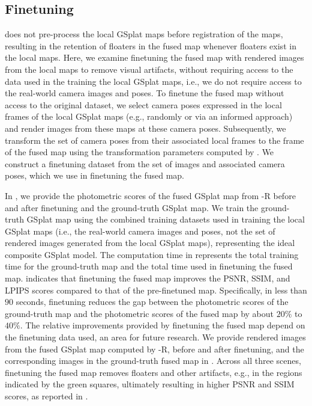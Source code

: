 \subsection{Finetuning}
\label{ssec:finetuning}
\algname does not pre-process the local GSplat maps before registration of the maps, resulting in the retention of floaters in the fused map whenever floaters exist in the local maps. Here, we examine finetuning the fused map with rendered images from the local maps to remove visual artifacts, without requiring access to the data used in the training the local GSplat maps, i.e., we do not require access to the real-world camera images and poses. To finetune the fused map without access to the original dataset, we select camera poses expressed in the local frames of the local GSplat maps (e.g., randomly or via an informed approach) and render images from these maps at these camera poses. Subsequently, we transform the set of camera poses from their associated local frames to the frame of the fused map using the transformation parameters computed by \algname. We construct a finetuning dataset from the set of images and associated camera poses, which we use in finetuning the fused map.

In , we provide the photometric scores of the fused GSplat map from \algname-R before and after finetuning and the ground-truth GSplat map. We train the ground-truth GSplat map using the combined training datasets used in training the local GSplat maps (i.e., the real-world camera images and poses, not the set of rendered images generated from the local GSplat maps), representing the ideal composite GSplat model. The computation time in  represents the total training time for the ground-truth map and the total time used in finetuning the fused map.  indicates that finetuning the fused map improves the PSNR, SSIM, and LPIPS scores compared to that of the pre-finetuned map. Specifically, in less than $90$ seconds, finetuning reduces the gap between the photometric scores of the ground-truth map and the photometric scores of the fused map by about $20\%$ to $40\%$. The relative improvements provided by finetuning the fused map depend on the finetuning data used, an area for future research. 
We provide rendered images from the fused GSplat map computed by \algname-R, before and after finetuning, and the corresponding images in the ground-truth fused map in . Across all three scenes, finetuning the fused map removes floaters and other artifacts, e.g., in the regions indicated by the green squares, ultimately resulting in higher PSNR and SSIM scores, as reported in .


